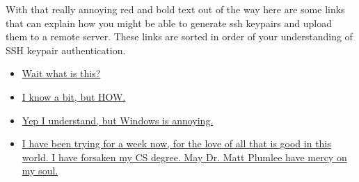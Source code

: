 \documentclass{article}
\begin{document}
With that really annoying red and bold text out of the way here are some links that can explain how you might be able to generate ssh keypairs and upload them to a remote server. These links are sorted
in order of your understanding of SSH keypair authentication.
\begin{itemize}
	\item \href{https://www.ssh.com/academy/ssh/public-key-authentication}{Wait what is this?}
	\item \href{https://www.digitalocean.com/community/tutorials/how-to-configure-ssh-key-based-authentication-on-a-linux-server}{I know a bit, but HOW.}
	\item \href{https://learn.microsoft.com/en-us/windows-server/administration/openssh/openssh_keymanagement}{Yep I understand, but Windows is annoying.}
	\item \href{https://stackoverflow.com/}{I have been trying for a week now, for the love of all that is good in this world. I have forsaken my CS degree. May Dr. Matt Plumlee have mercy on my soul.}
\end{itemize}
\end{document}

